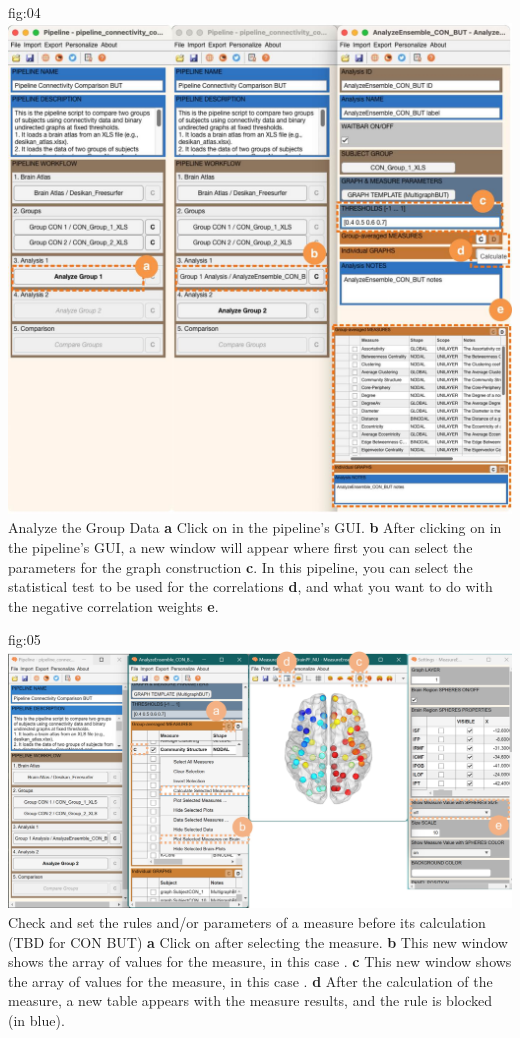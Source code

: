 \documentclass[justified]{tufte-handout}
\begin{document}
	{fig:04}
	{
	\includegraphics{fig04.jpg}
	}
	{Analyze the Group Data}
	{
	{\bf a} Click on  in the pipeline's GUI.
        {\bf b} After clicking on  in the pipeline's GUI, a new window will appear where first you can select the parameters for the graph construction {\bf c}. In this pipeline, you can select the statistical test to be used for the correlations {\bf d}, and what you want to do with the negative correlation weights {\bf e}.
	}

	{fig:05}
	{
	\includegraphics{fig05.jpg}
	}
	{Check and set the rules and/or parameters of a measure before its calculation (TBD for CON BUT)}
	{
	{\bf a} Click on  after selecting the measure.
	{\bf b} This new window shows the array of values for the measure, in this case .
 	{\bf c} This new window shows the array of values for the measure, in this case .
  	{\bf d} After the calculation of the measure, a new table appears with the measure results, and the rule is blocked (in blue).
	}
 
\end{document}
